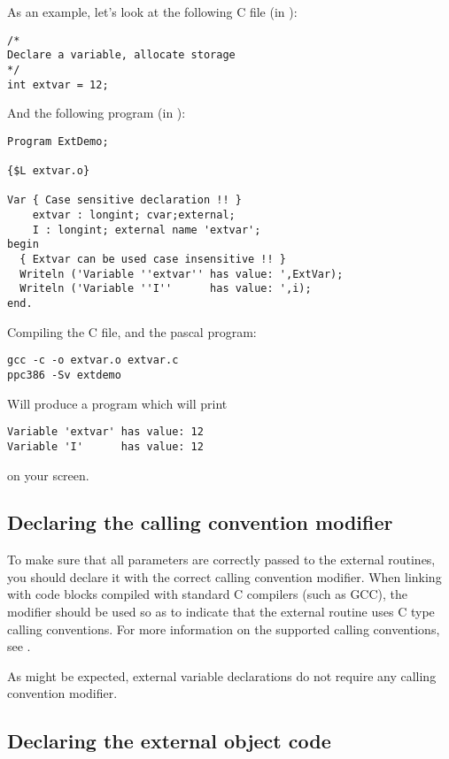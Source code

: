 As an example, let's look at the following C file (in ):
\begin{verbatim}
/*
Declare a variable, allocate storage
*/
int extvar = 12;
\end{verbatim}
And the following program (in ):
\begin{verbatim}
Program ExtDemo;

{$L extvar.o}

Var { Case sensitive declaration !! }
    extvar : longint; cvar;external;
    I : longint; external name 'extvar';
begin
  { Extvar can be used case insensitive !! }
  Writeln ('Variable ''extvar'' has value: ',ExtVar);
  Writeln ('Variable ''I''      has value: ',i);
end.
\end{verbatim}
Compiling the C file, and the pascal program:
\begin{verbatim}
gcc -c -o extvar.o extvar.c
ppc386 -Sv extdemo
\end{verbatim}
Will produce a program  which will print
\begin{verbatim}
Variable 'extvar' has value: 12
Variable 'I'      has value: 12
\end{verbatim}
on your screen.

\subsection{Declaring the calling convention modifier}

To make sure that all parameters are correctly passed to the
external routines, you should declare it with the correct
calling convention modifier. When linking with code blocks
compiled with standard C compilers (such as GCC), the 
modifier should be used so as to indicate that the external
routine uses C type calling conventions. For more information
on the supported calling conventions, see .

As might be expected, external variable declarations do not require
any calling convention modifier.

\subsection{Declaring the external object code}

